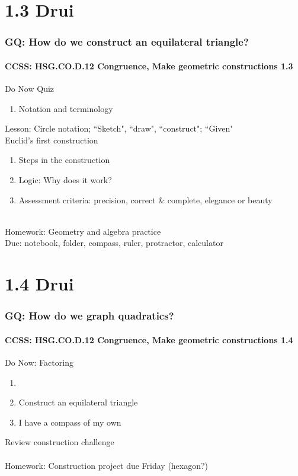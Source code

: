 \documentclass{beamer}
\begin{document}
  \section{1.3 Drui}
  \frame
  {
    \frametitle{GQ: How do we construct an equilateral triangle?}
    \framesubtitle{CCSS: HSG.CO.D.12 Congruence, Make geometric constructions \qquad \alert{1.3}}

    \begin{block}{Do Now Quiz}
    \begin{enumerate}
        \item Notation and terminology
    \end{enumerate}
    \end{block}
    Lesson: Circle notation; ``Sketch", ``draw", ``construct"; ``Given"\\[5pt]
    Euclid's first construction
    \begin{enumerate}
        \item Steps in the construction
        \item Logic: Why does it work?
        \item Assessment criteria: precision, correct \& complete, elegance or beauty
    \end{enumerate}
    \\%
    Homework: Geometry and algebra practice\\
    Due: notebook, folder, compass, ruler, protractor, calculator
  }

  \section{1.4 Drui}
  \frame
  {
    \frametitle{GQ: How do we graph quadratics?}
    \framesubtitle{CCSS: HSG.CO.D.12 Congruence, Make geometric constructions  \alert{1.4}}

    \begin{block}{Do Now: Factoring}
    \begin{enumerate}
        \item
        \item Construct an equilateral triangle
        \item I have a compass of my own
    \end{enumerate}
    \end{block}
    Review construction challenge\\

    \\%
    Homework: Construction project due Friday (hexagon?)
  }
\end{document}
